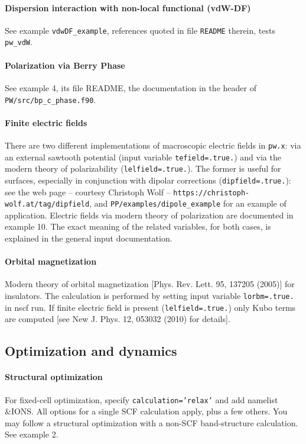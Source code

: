 \documentclass[12pt,a4paper]{article}
\def\pwx{\texttt{pw.x}}
\begin{document}
\paragraph{Dispersion interaction with non-local functional (vdW-DF)}
See example \texttt{vdwDF\_example}, references quoted in file
\texttt{README} therein, tests \texttt{pw\_vdW}.

\paragraph{Polarization via Berry Phase}
See example 4, its file README,  the documentation in the header of 
\texttt{PW/src/bp\_c\_phase.f90}. 

\paragraph{Finite electric fields}
There are two different implementations of macroscopic electric fields
in \pwx: via an external sawtooth potential (input variable
\texttt{tefield=.true.}) and via the modern theory of polarizability
(\texttt{lelfield=.true.}).
The former is useful for surfaces, especially in conjunction
with dipolar corrections (\texttt{dipfield=.true.}):
see the web page -- courtesy Christoph Wolf --
\texttt{https://christoph-wolf.at/tag/dipfield}, and 
\texttt{PP/examples/dipole\_example} for an example of application. 
Electric fields via modern theory of polarization are documented in
example 10. The exact meaning of the related variables, for both
cases, is explained in the general input documentation.

\paragraph{Orbital magnetization}
Modern theory of orbital magnetization [Phys. Rev. Lett. 95, 137205 (2005)]
for insulators. The calculation is performed by setting 
input variable \texttt{lorbm=.true.} in nscf run. If finite electric field 
is present (\texttt{lelfield=.true.}) only Kubo terms are computed
[see New J. Phys. 12, 053032 (2010) for details].

\subsection{Optimization and dynamics}

\paragraph{Structural optimization}
For fixed-cell optimization, specify \texttt{calculation='relax'} and 
add namelist \&IONS. All options for a single SCF calculation apply, 
plus a few others. You may follow a structural optimization with a
non-SCF band-structure calculation. See example 2.
\end{document}
